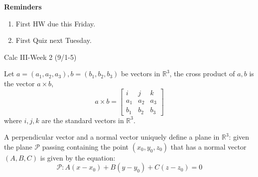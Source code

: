 \documentclass[openany]{book}
\newcommand{\R}{\mathbb{R}}
\begin{document}
\textbf{Reminders}
\begin{enumerate}
    \item First HW due this Friday.
    \item First Quiz next Tuesday.
\end{enumerate}





\newpage



\begin{center}
    \Large Calc III-Week 2 (9/1-5)
\end{center}



\renewcommand\thesection{\arabic{section}}


\begin{defn}
    Let $a=(a_1,a_2,a_3), b=(b_1,b_2,b_3)$ be vectors in $\R^3$, the cross product of $a,b$ is the vector $a\times b$, 
    \begin{equation*}
        a\times b=\begin{bmatrix}
            i&j&k\\
            a_1&a_2&a_3\\
            b_1&b_2&b_3
        \end{bmatrix}
    \end{equation*}
    where $i,j,k$ are the standard vectors in $\R^3$.
\end{defn}

\begin{defn}
    A perpendicular vector and a normal vector uniquely define a plane in $\R^3$: given the plane $\mathcal{P}$ passing containing the point $(x_0,y_0,z_0)$ that has a normal vector $(A,B,C)$ is given by the equation:
    \begin{equation*}
        \mathcal{P}: A(x-x_0)+B(y-y_0)+C(z-z_0)=0
    \end{equation*}
\end{defn}
\end{document}
